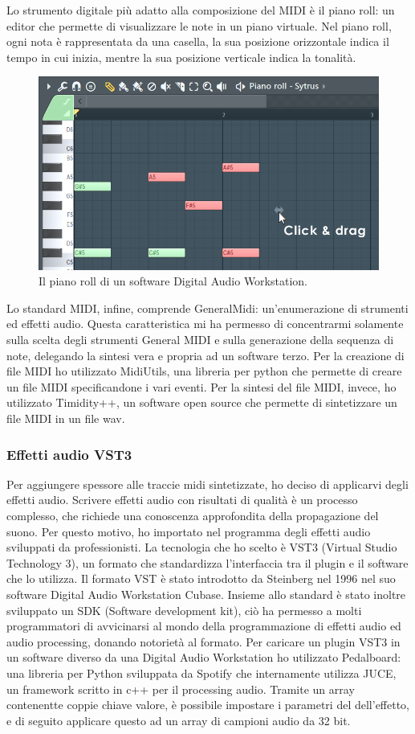 Lo strumento digitale più adatto alla composizione del MIDI è il piano roll: un editor che permette di visualizzare le note in un piano virtuale. 
Nel piano roll, ogni nota è rappresentata da una casella, la sua posizione orizzontale indica il tempo in cui inizia, mentre la sua posizione verticale indica la tonalità.
\begin{figure}[H]
    \includegraphics[width=\linewidth,scale=0.2]{img/pianoroll.png}
    \caption{Il piano roll di un software Digital Audio Workstation.}
    \label{fig:pianoroll}
\end{figure}
Lo standard MIDI, infine, comprende GeneralMidi: un'enumerazione di strumenti ed effetti audio.
Questa caratteristica mi ha permesso di concentrarmi solamente sulla scelta degli strumenti General MIDI e sulla generazione della sequenza di note, delegando la sintesi vera e propria ad un software terzo.
Per la creazione di file MIDI ho utilizzato MidiUtils, una libreria per python che permette di creare un file MIDI specificandone i vari eventi.
Per la sintesi del file MIDI, invece, ho utilizzato Timidity++, un software open source che permette di sintetizzare un file MIDI in un file wav.
\subsubsection{Effetti audio VST3}
Per aggiungere spessore alle traccie midi sintetizzate, ho deciso di applicarvi degli effetti audio.
Scrivere effetti audio con risultati di qualità è un processo complesso, che richiede una conoscenza approfondita della propagazione del suono.
Per questo motivo, ho importato nel programma degli effetti audio sviluppati da professionisti.
La tecnologia che ho scelto è VST3 (Virtual Studio Technology 3), un formato che standardizza l'interfaccia tra il plugin e il software che lo utilizza.
Il formato VST è stato introdotto da Steinberg nel 1996 nel suo software Digital Audio Workstation Cubase. Insieme allo standard è stato inoltre sviluppato un SDK (Software development kit), ciò ha permesso a molti programmatori
di avvicinarsi al mondo della programmazione di effetti audio ed audio processing, donando notorietà al formato.
Per caricare un plugin VST3 in un software diverso da una Digital Audio Workstation ho utilizzato Pedalboard: una libreria per Python sviluppata da Spotify che internamente utilizza JUCE, un framework scritto in c++ per il processing audio.
Tramite un array contenentte coppie chiave valore, è possibile impostare i parametri del dell'effetto, e di seguito applicare questo ad un array di campioni audio da 32 bit.

